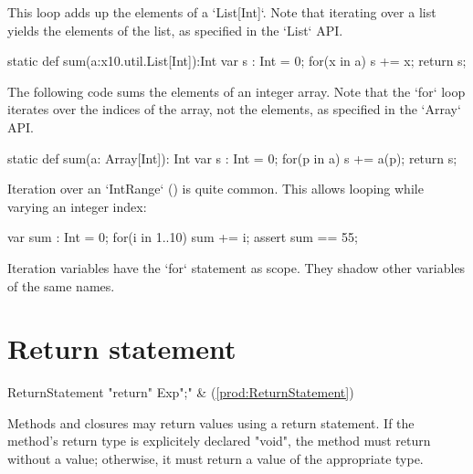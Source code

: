 \begin{ex}
This loop adds up the elements of a \xcd`List[Int]`.
Note that iterating over a list yields the elements of the list, as specified
in the \xcd`List` API. 
\begin{xten}
static def sum(a:x10.util.List[Int]):Int {
  var s : Int = 0;
  for(x in a) s += x;
  return s;
}
\end{xten}

The following code sums the elements of an integer array.  Note that the
\xcd`for` loop iterates over the indices of the array, not the elements, as
specified in the \xcd`Array` API.  
\begin{xten}
static def sum(a: Array[Int]): Int {
  var s : Int = 0;
  for(p in a) s += a(p);
  return s;
}
\end{xten}

Iteration over an \xcd`IntRange` () is quite common. This
allows looping while varying an integer index: 
\begin{xten}
var sum : Int = 0;
for(i in 1..10) sum += i;
assert sum == 55;
\end{xten}


\end{ex}

Iteration variables have the \xcd`for` statement as scope.  They shadow other
variables of the same names.


\section{Return statement}
\label{ReturnStatement}

\begin{bbgrammar}
     ReturnStatement \: \xcd"return" Exp\opt \xcd";" & (\ref{prod:ReturnStatement}) \\
\end{bbgrammar}

Methods and closures may return values using a return statement.
If the method's return type is explicitely declared \xcd"void",
the method must return without a value; otherwise, it must return
a value of the appropriate type.

